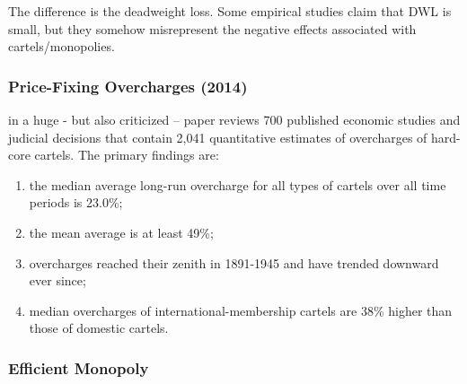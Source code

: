         The difference is the deadweight loss. Some empirical studies claim that DWL is small, but they somehow misrepresent the negative effects associated with cartels/monopolies.

        \subsubsection{Price-Fixing Overcharges (2014)}

            in a huge - but also criticized – paper reviews 700 published economic studies and judicial decisions that contain 2,041 quantitative estimates of overcharges of hard-core cartels. The primary findings are: 
            \begin{enumerate}
                \item the median average long-run overcharge for all types of cartels over all time periods is 23.0\%; 
                \item the mean average is at least 49\%; 
                \item overcharges reached their zenith in 1891-1945 and have trended downward ever since; 
                \item median overcharges of international-membership cartels are 38\% higher than those of domestic cartels.
            \end{enumerate}

        \subsubsection{Efficient Monopoly}

